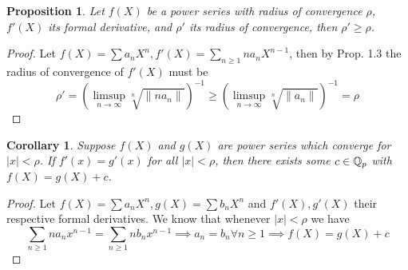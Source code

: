 \documentclass[a4paper]{article}
\theoremstyle{plain}
\newtheorem{prop}[thm]{Proposition}
\newtheorem{Cor}[thm]{Corollary}
\theoremstyle{definition}
\begin{document}
\begin{prop}
  Let $f(X)$ be a power series with radius of convergence $\rho$, $f'(X)$ its formal derivative, and $\rho'$ its radius of convergence, then $\rho' \geq \rho$.
\end{prop}
\begin{proof}
  Let $f(X) = \sum a_{n}X^{n}, f'(X) = \sum_{n \geq 1} na_{n}X^{n-1}$, then by Prop. 1.3 the radius of convergence of $f'(X)$ must be
  $$\rho' = \left( \limsup_{n \to \infty} \sqrt[n]{\|na_{n}\|} \right)^{-1} \geq \left( \limsup_{n \to \infty} \sqrt[n]{\|a_{n}\|} \right)^{-1} = \rho$$
\end{proof}
\begin{Cor} Suppose $f(X)$ and $g(X)$ are power series which converge for $|x| < \rho$. If $f'(x)=g'(x)$ for all $|x| < \rho$, then there exists some $c \in \Bbb Q_{p}$ with $f(X)=g(X)+c$.
\end{Cor}
\begin{proof}
  Let $f(X) = \sum a_{n}X^{n}, g(X) = \sum b_{n}X^{n}$ and $f'(X), g'(X)$ their respective formal derivatives. We know that whenever $|x| < \rho$ we have
  $$\sum_{n \geq 1}na_{n}x^{n-1} = \sum_{n \geq 1}nb_{n}x^{n-1} \implies a_{n} = b_{n} \forall n \geq 1 \implies f(X) = g(X) + c$$
\end{proof}
\end{document}
